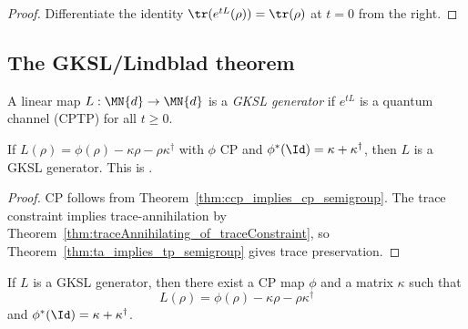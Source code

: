 \begin{proof}
    \leanok
    Differentiate the identity $\tr(e^{tL}(\rho)) = \tr(\rho)$ at $t = 0$
    from the right.
\end{proof}

\subsection{The GKSL/Lindblad theorem}

\begin{definition}\label{def:is_gksl_generator}
    \leanok
    A linear map $L : \MN{d} \to \MN{d}$ is a \emph{GKSL generator}
    if $e^{tL}$ is a quantum channel (CPTP) for all $t \ge 0$.
\end{definition}

\begin{theorem}
    \label{thm:gksl_of_generatorDecomp}
    \leanok
    If $L(\rho) = \phi(\rho) - \kappa\rho - \rho\kappa^\dagger$ with
    $\phi$ CP and $\phi^*(\Id) = \kappa + \kappa^\dagger$,
    then $L$ is a GKSL generator.
    This is \cite[Theorem~7.1, Equation~(7.20)]{Wolf2012Quantum}.
\end{theorem}

\begin{proof}
    \leanok
    CP follows from Theorem~\ref{thm:ccp_implies_cp_semigroup}.
    The trace constraint implies trace-annihilation by
    Theorem~\ref{thm:traceAnnihilating_of_traceConstraint}, so
    Theorem~\ref{thm:ta_implies_tp_semigroup} gives trace preservation.
\end{proof}

\begin{theorem}
    \label{thm:generatorDecomp_of_gksl}
    \leanok
    If $L$ is a GKSL generator, then there exist a CP map $\phi$ and a matrix
    $\kappa$ such that
    \[
        L(\rho) = \phi(\rho) - \kappa\rho - \rho\kappa^\dagger
    \]
    and $\phi^*(\Id) = \kappa + \kappa^\dagger$.
\end{theorem}

